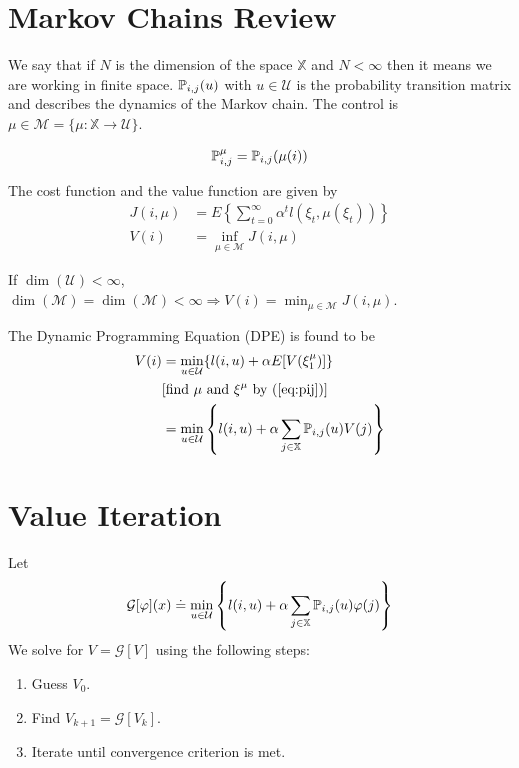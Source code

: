 
\mainmatter
\setcounter{page}{1}

\lectureseries[\course]{\course}

\date{November 3, 2009}

\setaddress

\setcounter{lecture}{10}
\setcounter{chapter}{10}


\section{Markov Chains Review}
We say that if $N$ is the dimension of the space $\mathbb{X}$ and $N<\infty$ then it means we are working in finite space. $\mathbb{P}_{i,j}(u)$ with $u\in\mathcal{U}$ is the probability transition matrix and describes the dynamics of the Markov chain. The control is $\mu\in\mathcal{M} = \{\mu:\mathbb{X}\to\mathcal{U}\}$.

\begin{align}
\label{eq:pij}
\mathbb{P}_{i,j}^\mu = \mathbb{P}_{i,j}(\mu(i))
\end{align}

The cost function and the value function are given by
\begin{align*}
J(i,\mu) &= E\left\lbrace \sum_{t=0}^\infty \alpha^tl(\xi_t,\mu(\xi_t))\right\rbrace \\
V(i) &= \inf_{\mu\in\mathcal{M}}J(i,\mu)
\end{align*}

If $\dim(\mathcal{U})<\infty$, $\dim(\mathcal{M})=\dim(\mathcal{M})<\infty\Rightarrow V(i)=\min_{\mu\in\mathcal{M}}J(i,\mu)$.

The Dynamic Programming Equation (DPE) is found to be
\begin{align}
\label{eq:mcdpe}
V(i) &= \min_{u\in\mathcal{U}}\{l(i,u)+\alpha E[V(\xi_1^\mu)]\} \nonumber \\
&[\text{find } \mu \text{ and } \xi^\mu \text{ by (\ref{eq:pij})}] \nonumber \\
&= \min_{u\in\mathcal{U}} \left\lbrace l(i,u)+\alpha\sum_{j\in\mathbb{X}}\mathbb{P}_{i,j}(u)V(j)\right\rbrace
\end{align}

\section{Value Iteration}
Let
$$\mathcal{G}[\varphi](x) \doteq \min_{u\in\mathcal{U}}\left\lbrace l(i,u)+\alpha\sum_{j\in\mathbb{X}}\mathbb{P}_{i,j}(u)\varphi(j)\right\rbrace$$
We solve for $V=\mathcal{G}[V]$ using the following steps:
\begin{enumerate}
\item Guess $V_0$.
\item Find $V_{k+1}=\mathcal{G}[V_k]$.
\item Iterate until convergence criterion is met.
\end{enumerate}

